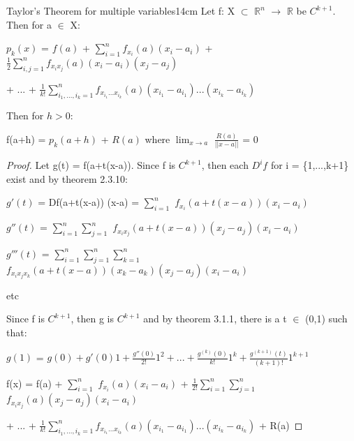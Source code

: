     \vspace{0.5cm}



    \begin{wtheorem}{Taylor's Theorem for multiple variables}{14cm}
        Let f: X $\subset$ $\mathbb{R}^n$ $\rightarrow$ $\mathbb{R}$
        be $C^{k+1}$. Then for a $\in$ X:

        \hspace{0.5cm}
        $p_k(x)$
        = $f(a)$
            + $\sum_{i=1}^n f_{x_i}(a)(x_i - a_i)$
            + $\frac{1}{2} \sum_{i,j=1}^n f_{x_ix_j}(a)(x_i - a_i)(x_j - a_j)$

            \hspace{2cm}
            + ...
            + $\frac{1}{k!} \sum_{i_1,...,i_k=1}^n
                f_{x_{i_1}...x_{i_k}}(a)(x_{i_1} - a_{i_1})...(x_{i_k} - a_{i_k})$

        Then for $h > 0$:

        \hspace{0.5cm}
        f(a+h) = $p_k(a+h)$ + $R(a)$
        \hspace{1cm}
        where $\lim_{x \rightarrow a}$ $\frac{R(a)}{||x-a||}$ = 0
    \end{wtheorem}

    \begin{proof}
        Let g(t) = f(a+t(x-a)).
        Since f is $C^{k+1}$, then each $D^if$ for i = \{1,...,k+1\} exist
        and by {\color{red} theorem 2.3.10}:

        \hspace{0.5cm}
        $g'(t)$
        = Df(a+t(x-a)) (x-a)
        = $\sum_{i=1}^n$ $f_{x_i}(a+t(x-a))(x_i-a_i)$

        \hspace{0.5cm}
        $g''(t)$
        = $\sum_{i=1}^n \sum_{j=1}^n$
            $f_{x_ix_j}(a+t(x-a))(x_j-a_j)(x_i-a_i)$

        \hspace{0.5cm}
        $g'''(t)$
        = $\sum_{i=1}^n \sum_{j=1}^n \sum_{k=1}^n$
            $f_{x_ix_jx_k}(a+t(x-a))(x_k-a_k)(x_j-a_j)(x_i-a_i)$

        \hspace{0.5cm}
        etc

        Since f is $C^{k+1}$, then g is $C^{k+1}$ and by {\color{red} theorem 3.1.1},
        there is a t $\in$ (0,1) such that:

        \hspace{0.5cm}
        $g(1)$ = $g(0) + g'(0)1 + \frac{g''(0)}{2!}1^2
                    + ... + \frac{g^{(k)}(0)}{k!}1^k
                    + \frac{g^{(k+1)}(t)}{(k+1)!}1^{k+1}$

        \hspace{0.5cm}
        f(x) = f(a) + $\sum_{i=1}^n$ $f_{x_i}(a)(x_i-a_i)$
                + $\frac{1}{2!} \sum_{i=1}^n \sum_{j=1}^n$
                    $f_{x_ix_j}(a)(x_j-a_j)(x_i-a_i)$

            \hspace{1.7cm}
            + ... +
            $\frac{1}{k!} \sum_{i_1,...,i_k=1}^n
                f_{x_{i_1}...x_{i_k}}(a)(x_{i_1} - a_{i_1})...(x_{i_k} - a_{i_k})$
            + R(a)
    \end{proof}


